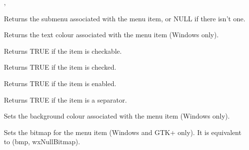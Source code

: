
, 

\label{wxmenuitemgetsubmenu}


Returns the submenu associated with the menu item, or NULL if there isn't one.

\label{wxmenuitemgettextcolour}


Returns the text colour associated with the menu item (Windows only).

\label{wxmenuitemischeckable}


Returns TRUE if the item is checkable.

\label{wxmenuitemischecked}


Returns TRUE if the item is checked.

\label{wxmenuitemisenabled}


Returns TRUE if the item is enabled.

\label{wxmenuitemisseparator}


Returns TRUE if the item is a separator.

\label{wxmenuitemsetbackgroundcolour}


Sets the background colour associated with the menu item (Windows only).

\label{wxmenuitemsetbitmap}


Sets the bitmap for the menu item (Windows and GTK+ only). It is
equivalent to (bmp, wxNullBitmap).

